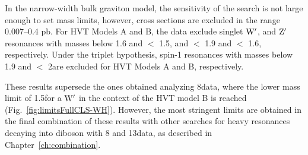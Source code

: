 In the narrow-width bulk graviton model, the sensitivity of the search is not large enough to set mass limits, however, cross sections are excluded in the range 0.007--0.4 pb.
For HVT Models A and B, the data exclude singlet $\mathrm{W}^\prime$, and $\mathrm{Z}^\prime$ resonances with masses below 1.6 and $<$ 1.5, and $<$ 1.9 and $<$ 1.6\TeV, respectively.
Under the triplet hypothesis, spin-1 resonances with masses below 1.9 and $<$ 2\TeV are excluded for HVT Models A and B, respectively.

These results supersede the ones obtained analyzing 8\TeV data, where the lower mass limit of 1.5\TeV for a $\mathrm{W}^\prime$ in the context of the HVT model B is reached (Fig.~\ref{fig:limitsFullCLS-WH}).
However, the most stringent limits are obtained in the final combination of these results with other searches for heavy resonances decaying into diboson with 8 and 13\TeV data, as described in Chapter~\ref{ch:combination}.
